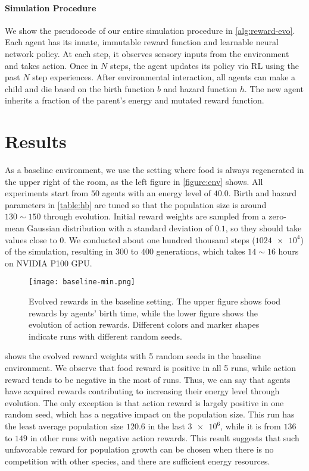 \paragraph{Simulation Procedure}
We show the pseudocode of our entire simulation procedure in \cref{alg:reward-evo}. Each agent has its innate, immutable reward function and learnable neural network policy. At each step, it observes sensory inputs from the environment and takes action. Once in $N$ steps, the agent updates its policy via RL using the past $N$ step experiences. After environmental interaction, all agents can make a child and die based on the birth function $b$ and hazard function $h$. The new agent inherits a fraction of the parent's energy and mutated reward function.

\section{Results}
As a baseline environment, we use the setting where food is always regenerated in the upper right of the room, as the left figure in \cref{figure:env} shows. All experiments start from $50$ agents with an energy level of $40.0$. Birth and hazard parameters in \cref{table:hb} are tuned so that the population size is around $130\sim 150$ through evolution. Initial reward weights are sampled from a zero-mean Gaussian distribution with a standard deviation of $0.1$, so they should take values close to $0$. We conducted about one hundred thousand steps ($\num{1024e4}$) of the simulation, resulting in $300$ to $400$ generations, which takes $14\sim16$ hours on NVIDIA P100 GPU.

\begin{figure}[!htb]
  \centering
  \texttt{[image: baseline-min.png]}
  \caption{
    Evolved rewards in the baseline setting.
    The upper figure shows food rewards by agents' birth time, while the lower figure shows the evolution of action rewards.
    Different colors and marker shapes indicate runs with different random seeds.
  }\label{figure:result-baseline}
\end{figure}

 shows the evolved reward weights with 5 random seeds in the baseline environment. We observe that food reward is positive in all 5 runs, while action reward tends to be negative in the most of runs. Thus, we can say that agents have acquired rewards contributing to increasing their energy level through evolution. The only exception is that action reward is largely positive in one random seed, which has a negative impact on the population size. This run has the least average population size $120.6$ in the last $\num{3e6}$, while it is from $136$ to $149$ in other runs with negative action rewards. This result suggests that such unfavorable reward for population growth can be chosen when there is no competition with other species, and there are sufficient energy resources.

